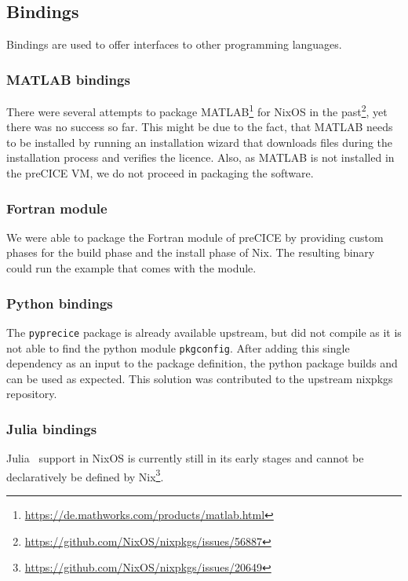 \documentclass{eceasst}
\begin{document}
\subsection{Bindings}

Bindings are used to offer interfaces to other programming languages.

\subsubsection{MATLAB bindings}

There were several attempts to package MATLAB\footnote{\url{https://de.mathworks.com/products/matlab.html}} for NixOS in the past\footnote{\url{https://github.com/NixOS/nixpkgs/issues/56887}}, yet there was no success so far.
This might be due to the fact, that MATLAB needs to be installed by running an installation wizard that downloads files during the installation process and verifies the licence.
Also, as MATLAB is not installed in the preCICE VM, we do not proceed in packaging the software.

\subsubsection{Fortran module}

We were able to package the Fortran module of preCICE by providing custom phases for the build phase and the install phase of Nix.
The resulting binary could run the example that comes with the module.

\subsubsection{Python bindings}

The \texttt{pyprecice} package is already available upstream, but did not compile as it is not able to find the python module \texttt{pkgconfig}.
After adding this single dependency as an input to the package definition, the python package builds and can be used as expected.
This solution was contributed to the upstream nixpkgs repository.

\subsubsection{Julia bindings}

Julia~\cite{bezanson2017julia} support in NixOS is currently still in its early stages and cannot be declaratively be defined by Nix\footnote{\url{https://github.com/NixOS/nixpkgs/issues/20649}}.
\end{document}
